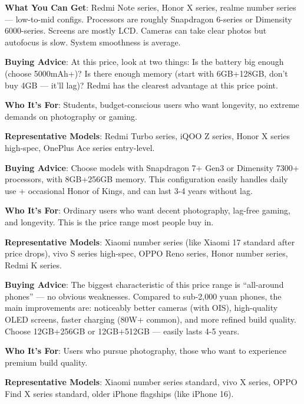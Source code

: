 \textbf{What You Can Get}: Redmi Note series, Honor X series, realme number series — low-to-mid configs. Processors are roughly Snapdragon 6-series or Dimensity 6000-series. Screens are mostly LCD. Cameras can take clear photos but autofocus is slow. System smoothness is average.

\textbf{Buying Advice}: At this price, look at two things: Is the battery big enough (choose 5000mAh+)? Is there enough memory (start with 6GB+128GB, don't buy 4GB — it'll lag)? Redmi has the clearest advantage at this price point.


\textbf{Who It's For}: Students, budget-conscious users who want longevity, no extreme demands on photography or gaming.

\textbf{Representative Models}: Redmi Turbo series, iQOO Z series, Honor X series high-spec, OnePlus Ace series entry-level.

\textbf{Buying Advice}: Choose models with Snapdragon 7+ Gen3 or Dimensity 7300+ processors, with 8GB+256GB memory. This configuration easily handles daily use + occasional Honor of Kings, and can last 3-4 years without lag.


\textbf{Who It's For}: Ordinary users who want decent photography, lag-free gaming, and longevity. This is the price range most people buy in.

\textbf{Representative Models}: Xiaomi number series (like Xiaomi 17 standard after price drops), vivo S series high-spec, OPPO Reno series, Honor number series, Redmi K series.

\textbf{Buying Advice}: The biggest characteristic of this price range is “all-around phones” — no obvious weaknesses. Compared to sub-2,000 yuan phones, the main improvements are: noticeably better cameras (with OIS), high-quality OLED screens, faster charging (80W+ common), and more refined build quality. Choose 12GB+256GB or 12GB+512GB — easily lasts 4-5 years.


\textbf{Who It's For}: Users who pursue photography, those who want to experience premium build quality.

\textbf{Representative Models}: Xiaomi number series standard, vivo X series, OPPO Find X series standard, older iPhone flagships (like iPhone 16).

